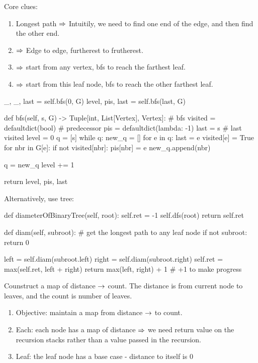 Core clues:
\begin{enumerate}
\item Longest path $\Rightarrow$ Intuitily, we need to find one end of the edge, and then find the other end.
\item {} $\Rightarrow$ Edge to edge, furtherest to frutherest.
\item {} $\Rightarrow$ start from any vertex, bfs to reach the farthest leaf.
\item {} $\Rightarrow$ start from this leaf node, bfs to reach the other farthest leaf. 
\end{enumerate}
\begin{python}
_, _, last = self.bfs(0, G)
level, pis, last = self.bfs(last, G)

def bfs(self, s, G) -> Tuple[int, List[Vertex], Vertex]:
    # bfs
    visited = defaultdict(bool)
    # predecessor 
    pis = defaultdict(lambda: -1)
    last = s  # last visited
    level = 0
    q = [s]
    while q:
        new_q = []
        for e in q:
            last = e
            visited[e] = True
            for nbr in G[e]:
                if not visited[nbr]:
                    pis[nbr] = e
                    new_q.append(nbr)

        q = new_q
        level += 1

    return level, pis, last
\end{python}

Alternatively, use tree:
\begin{python}
def diameterOfBinaryTree(self, root):
    self.ret = -1
    self.dfs(root)
    return self.ret        

def diam(self, subroot):
    # get the longest path to any leaf node
    if not subroot:
        return 0
    
    left = self.diam(subroot.left)
    right = self.diam(subroot.right)
    self.ret = max(self.ret, left + right)
    return max(left, right) + 1  # +1 to make progress
\end{python}


 Counstruct a map of distance $\rightarrow$ count. The distance is from current node to leaves, and the count is number of leaves. 

\begin{enumerate}
\item Objective: maintain a map from distance $\rightarrow$ to count.
\item Each: each node has a map of distance $\Rightarrow$ we need return value on the recursion stacks rather than a value passed in the recursion. 
\item Leaf: the leaf node has a base case - distance to itself is 0
\end{enumerate}

